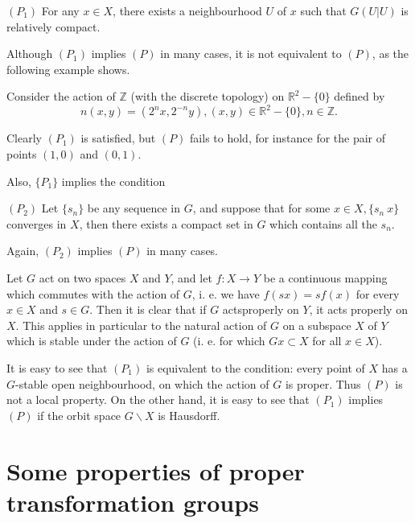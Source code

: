 \noindent
$(P_1)$ For any $x \in X$, there exists a neighbourhood $U$ of $x$
such that $G(U | U)$ is relatively compact. 

Although $(P_1)$ implies $(P)$ in many cases, it is not equivalent to
$(P)$, as the following example shows. 

\begin{example*}
  Consider the action of $\mathbb{Z}$ (with the discrete topology) on
  $\mathbb{R}^2-\{0\}$ defined by 
  $$
  n(x, y) = (2^n x, 2^{-n} y), (x, y) \in \mathbb{R}^2- \{ 0 \}, n \in
  \mathbb{Z}. 
  $$
\end{example*} 

Clearly $(P_1)$ is satisfied, but $(P)$ fails to hold, for instance
for the pair of points $(1, 0)$ and $(0, 1)$. 

Also, $\{P_1\}$ implies the condition

$(P_2)$ Let $\{s_n\}$ be any sequence in $G$, and suppose that for
some $x \in X, \{s_n~ x\}$ converges in $X$, then there exists a
compact set in $G$ which contains all the $s_n$. 

Again, $(P_2)$ implies $(P)$ in many cases.

\begin{rem}%
  Let $G$ act on two spaces $X$ and $Y$, and let $f : X \to Y$ be a
  continuous mapping which commutes with the action of $G$,  i. e. we
  have $f (sx) = sf(x)$ for every $x \in X$ and $s \in G$. Then it is
  clear that if $G$ acts\pageoriginale properly on $Y$, it acts properly on $X$. This
  applies in particular to the natural action of $G$ on a subspace $X$
  of $Y$ which is stable under the action of $G$ (i. e. for which $Gx
  \subset X$ for all $x \in X$). 
\end{rem}

\begin{rem}%
  It is easy to see that $(P_1)$ is equivalent to the condition: every
  point of $X$ has a $G$-stable open neighbourhood, on which the action
  of $G$ is proper. Thus $(P)$ is not a local property. On the other
  hand, it is easy to see that $(P_1)$ implies $(P)$ if the orbit space
  $G \backslash X$ is Hausdorff.  
\end{rem}

\section[Some properties of proper transformation...]{Some properties of proper transformation groups}\label{chap1:sec2}%

